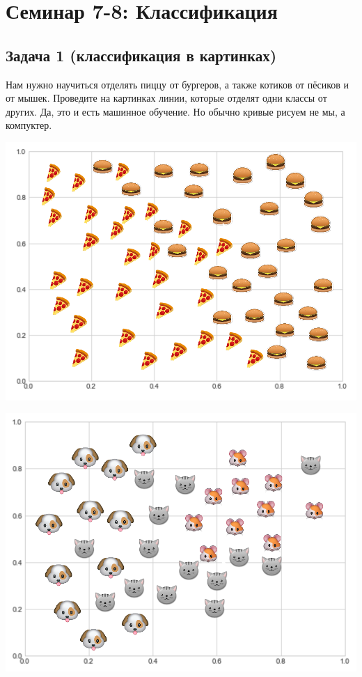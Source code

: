 \documentclass[12pt, a4paper, oneside]{article}
\begin{document}
\section*{Семинар 7-8:  Классификация}

\subsection*{Задача 1 (классификация в картинках)}

Нам нужно научиться отделять пиццу от бургеров, а также котиков от пёсиков и от мышек. Проведите на картинках линии, которые отделят одни классы от других.  Да, это и есть машинное обучение. Но обычно кривые рисуем не мы, а компуктер.

\begin{minipage}[t]{0.45\textwidth}
	\includegraphics[scale=0.21]{class_1.png}
\end{minipage}
\hfill
\begin{minipage}[t]{0.45\textwidth}
	\includegraphics[scale=0.21]{class_2.png}
\end{minipage}
\end{document}
